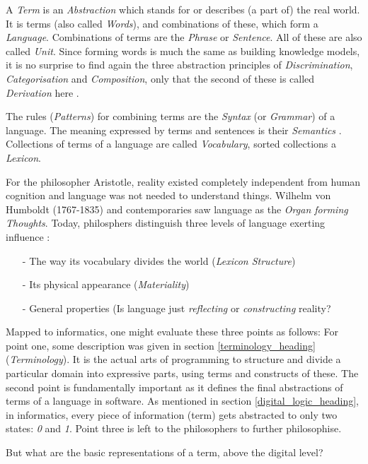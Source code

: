 A \emph{Term} is an \emph{Abstraction} which stands for or describes (a part of)
the real world. It is terms (also called \emph{Words}), and combinations of
these, which form a \emph{Language}. Combinations of terms are the \emph{Phrase}
or \emph{Sentence}. All of these are also called \emph{Unit}. Since forming words
is much the same as building knowledge models, it is no surprise to find again
the three abstraction principles of \emph{Discrimination}, \emph{Categorisation}
and \emph{Composition}, only that the second of these is called \emph{Derivation}
here \cite{canoo}.

The rules (\emph{Patterns}) for combining terms are the \emph{Syntax} (or
\emph{Grammar}) of a language. The meaning expressed by terms and sentences is
their \emph{Semantics} \cite{duden}. Collections of terms of a language are
called \emph{Vocabulary}, sorted collections a \emph{Lexicon}.

For the philosopher Aristotle, reality existed completely independent from human
cognition and language was not needed to understand things. Wilhelm von Humboldt
(1767-1835) and contemporaries saw language as the \emph{Organ forming Thoughts}.
Today, philosphers distinguish three levels of language exerting influence
\cite{jaeger}:

\begin{itemize}
    \item[-] The way its vocabulary divides the world (\emph{Lexicon Structure})
    \item[-] Its physical appearance (\emph{Materiality})
    \item[-] General properties (Is language just \emph{reflecting} or
        \emph{constructing} reality?
\end{itemize}

Mapped to informatics, one might evaluate these three points as follows:
For point one, some description was given in section \ref{terminology_heading}
(\emph{Terminology}). It is the actual arts of programming to structure and divide
a particular domain into expressive parts, using terms and constructs of these.
The second point is fundamentally important as it defines the final abstractions
of terms of a language in software. As mentioned in section
\ref{digital_logic_heading}, in informatics, every piece of information (term)
gets abstracted to only two states: \emph{0} and \emph{1}.
Point three is left to the philosophers to further philosophise.

But what are the basic representations of a term, above the digital level?


